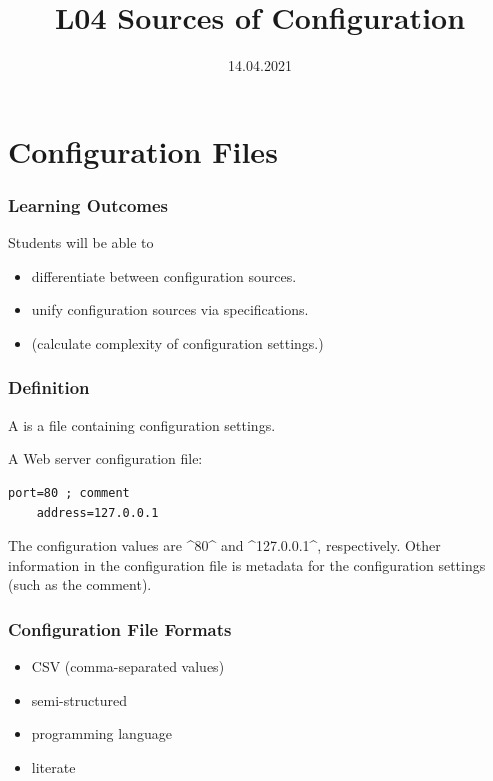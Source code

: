 


\title{L04 Sources of Configuration}
\date{14.04.2021}



\section{Configuration Files}

\begin{frame}
	\frametitle{Learning Outcomes}
	Students will be able to
	\begin{itemize}
	\item differentiate between configuration sources.
	\item unify configuration sources via specifications.
	\item (calculate complexity of configuration settings.)
	\end{itemize}
\end{frame}

\begin{frame}[fragile]
	\frametitle{Definition}
	A  is a file containing configuration settings.

	\pause
	A Web server configuration file:

	\begin{lstlisting}[gobble=4]
	port=80 ; comment
	address=127.0.0.1\end{lstlisting}

	\pause

	The configuration values are ^80^ and ^127.0.0.1^, respectively.
	Other information in the configuration file is metadata for the configuration settings (such as the comment).
\end{frame}

\begin{frame}
	\frametitle{Configuration File Formats}
	\begin{itemize}
	\item CSV (comma-separated values)
	\item semi-structured
	\item programming language
	\item literate
	\end{itemize}
\end{frame}

